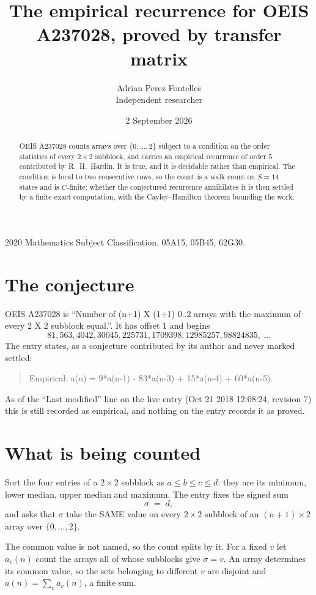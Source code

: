 \documentclass[11pt,a4paper]{article}
\title{The empirical recurrence for OEIS A237028, proved by transfer matrix}
\author{Adrian Perez Fontelles\\ \small Independent researcher}
\date{2 September 2026}
\theoremstyle{plain}
\theoremstyle{definition}
\begin{document}
\maketitle

\begin{abstract}
OEIS A237028 counts arrays over $\{0,\dots,2\}$ subject to a condition on the order
statistics of every $2\times2$ subblock, and carries an empirical recurrence of order
$5$ contributed by R.~H.~Hardin. It is true, and it is decidable rather than empirical.
The condition is local to two consecutive rows, so the count is a walk count on $S=14$
states and is $C$-finite; whether the conjectured recurrence annihilates it is then settled by
a finite exact computation, with the Cayley--Hamilton theorem bounding the work.
\end{abstract}

\noindent\small 2020 Mathematics Subject Classification. 05A15, 05B45, 62G30.\normalsize

\section{The conjecture}

OEIS A237028 is ``Number of (n+1) X (1+1) 0..2 arrays with the maximum of every 2 X 2 subblock equal.''. It has offset $1$ and begins
\[
81, 563, 4042, 30045, 225731, 1709398, 12985257, 98824835,\ \dots
\]
The entry states, as a conjecture contributed by its author and never marked settled:
\begin{quote}
Empirical: a(n) = 9*a(n-1) - 83*a(n-3) + 15*a(n-4) + 60*a(n-5).
\end{quote}
As of the ``Last modified'' line on the live entry (Oct 21 2018 12:08:24, revision 7) this is still
recorded as empirical, and nothing on the entry records it as proved.

\section{What is being counted}

Sort the four entries of a $2\times2$ subblock as $a\le b\le c\le d$: they
are its minimum, lower median, upper median and maximum. The entry fixes the signed sum
\[
\sigma\;=\;d,
\]
and asks that $\sigma$ take the SAME value on every $2\times2$ subblock of an
$(n+1)\times2$ array over $\{0,\dots,2\}$.

The common value is not named, so the count splits by it. For a fixed $v$ let $a_v(n)$ count
the arrays all of whose subblocks give $\sigma=v$. An array determines its common value, so
the sets belonging to different $v$ are disjoint and $a(n)=\sum_v a_v(n)$, a finite sum.
\end{document}
